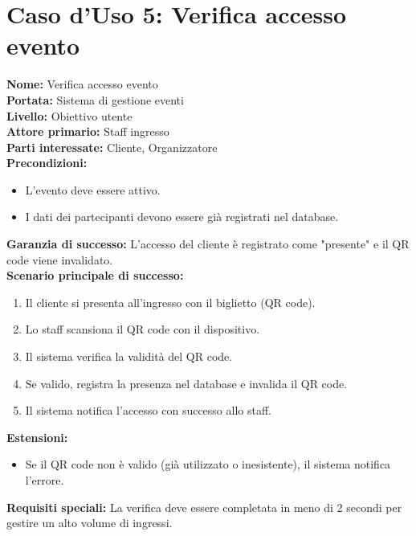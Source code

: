 \documentclass[a4paper,12pt]{article}
\begin{document}
{\section*{\textcolor{sectioncolor}{Caso d'Uso 5: Verifica accesso evento}}
\textcolor{textcolor}{
\textbf{Nome:} Verifica accesso evento\\
\textbf{Portata:} Sistema di gestione eventi\\
\textbf{Livello:} Obiettivo utente\\
\textbf{Attore primario:} Staff ingresso\\
\textbf{Parti interessate:} Cliente, Organizzatore\\
\textbf{Precondizioni:}
\begin{itemize}
    \item L'evento deve essere attivo.
    \item I dati dei partecipanti devono essere già registrati nel database.
\end{itemize}
\textbf{Garanzia di successo:} L'accesso del cliente è registrato come "presente" e il QR code viene invalidato.\\
\textbf{Scenario principale di successo:}
\begin{enumerate}
    \item Il cliente si presenta all'ingresso con il biglietto (QR code).
    \item Lo staff scansiona il QR code con il dispositivo.
    \item Il sistema verifica la validità del QR code.
    \item Se valido, registra la presenza nel database e invalida il QR code.
    \item Il sistema notifica l'accesso con successo allo staff.
\end{enumerate}
\textbf{Estensioni:}
\begin{itemize}
    \item Se il QR code non è valido (già utilizzato o inesistente), il sistema notifica l'errore.
\end{itemize}
\textbf{Requisiti speciali:} La verifica deve essere completata in meno di 2 secondi per gestire un alto volume di ingressi.
}

}
\end{document}
